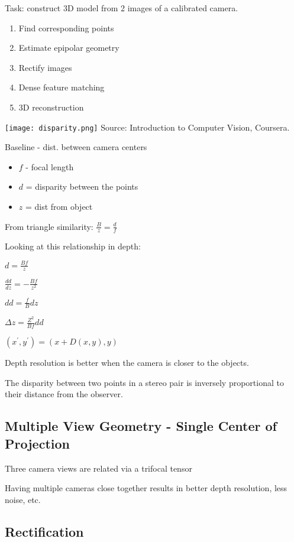 Task: construct 3D model from 2 images of a calibrated camera.

\begin{enumerate}
\item Find corresponding points
\item Estimate epipolar geometry
\item Rectify images
\item Dense feature matching
\item 3D reconstruction
\end{enumerate}

\texttt{[image: disparity.png]}
Source: Introduction to Computer Vision, Coursera.

Baseline - dist. between camera centers
\begin{itemize}
\item $f$ - focal length
\item $d$ = disparity between the points
\item $z$ = dist from object
\end{itemize}

From triangle similarity: $\frac{B}{z} = \frac{d}{f}$

Looking at this relationship in depth:

${d}=\frac{Bf}{z} $

$\frac{dd}{dz}=-\frac{Bf}{z^2}$

$dd = \frac{f}{B}dz$

$\Delta z = \frac{Z^2}{Bf}dd$

$(x^\prime,y^\prime)=(x+D(x,y),y)$

Depth resolution is better when the camera is closer to the objects.

The disparity between two points in a stereo pair is inversely proportional to their distance from the observer.

\subsection{Multiple View Geometry - Single Center of Projection}

Three camera views are related via a trifocal tensor 

Having multiple cameras close together results in better depth resolution, less noise, etc.

\subsection{Rectification}

